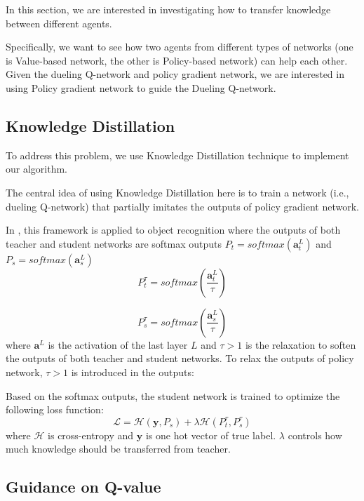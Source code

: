 In this section, we are interested in investigating how to transfer knowledge between different agents.

Specifically, we want to see how two agents from different types of networks (one is Value-based network, the other is Policy-based network) can help each other.
% 
Given the dueling Q-network and policy gradient network, we are interested in using Policy gradient network to guide the Dueling Q-network.

\subsection{Knowledge Distillation}


To address this problem, we use Knowledge Distillation \cite{hinton2015distilling} technique to implement our algorithm.

The central idea of using Knowledge Distillation here is to train a network (i.e., dueling Q-network) that partially imitates the outputs of policy gradient network.

In \cite{hinton2015distilling}, this framework is applied to object recognition where the outputs of both teacher and student networks are softmax outputs $P_{t} = softmax(\textbf{a}^{L}_{t})$ and  $P_{s} = softmax(\textbf{a}^{L}_{s})$ 
\begin{equation}
P^{\tau}_{t} = softmax(\frac{\textbf{a}^{L}_{t}}{\tau} )
\end{equation}

\begin{equation}
P^{\tau}_{s} = softmax(\frac{\textbf{a}^{L}_{s}}{\tau} )
\end{equation}
%
where $\textbf{a}^{L}$ is the activation of the last layer $L$ and $\tau > 1$ is the relaxation to soften the outputs of both teacher and student networks. 
%
To relax the outputs of policy network, $\tau >1$ is introduced in the outputs:

Based on the softmax outputs, the student network is trained to optimize the following loss function:
\begin{equation}
\mathcal{L} = \mathcal{H} ( \textbf{y},P_{s} ) + \lambda\mathcal{H} ( P^{\tau}_{t},P^{\tau}_{s} ) 
\end{equation}
where $\mathcal{H}$ is cross-entropy and $\textbf{y}$ is one hot vector of true label. $\lambda$ controls how much knowledge should be transferred from teacher. 
 
\subsection{Guidance on Q-value}

